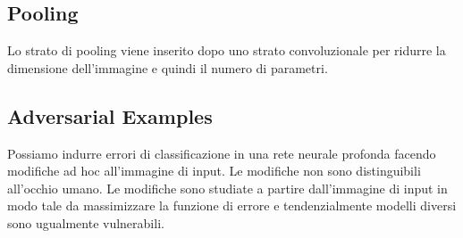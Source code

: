 \subsection{Pooling}

Lo strato di pooling viene inserito dopo uno strato convoluzionale per ridurre
la dimensione dell'immagine e quindi il numero di parametri.

\subsection{Adversarial Examples}

Possiamo indurre errori di classificazione in una rete neurale profonda facendo
modifiche ad hoc all'immagine di input. Le modifiche non sono distinguibili
all'occhio umano. Le modifiche sono studiate a partire dall'immagine di input in
modo tale da massimizzare la funzione di errore e tendenzialmente modelli
diversi sono ugualmente vulnerabili.
